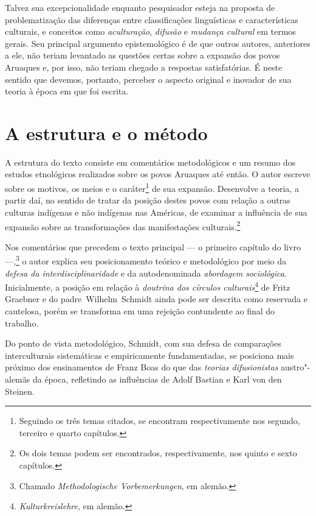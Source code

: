 Talvez sua excepcionalidade enquanto pesquisador esteja na proposta de problematização das diferenças entre classificações linguísticas e características culturais, e conceitos como \textit{aculturação}, \textit{difusão} e \textit{mudança cultural} em termos gerais. Seu principal argumento epistemológico é de que outros autores, anteriores a ele, não teriam levantado as questões certas sobre a expansão dos povos Aruaques e, por isso, não teriam chegado a respostas satisfatórias. É neste sentido que devemos, portanto, perceber o aspecto original e inovador de sua teoria à época em que foi escrita.

\section{A estrutura e o método}

A estrutura do texto consiste em comentários metodológicos e um resumo dos estudos etnológicos realizados sobre os povos Aruaques até então. O autor escreve sobre os motivos, os meios e o caráter\footnote{Seguindo os três temas citados, se encontram respectivamente nos segundo, terceiro e quarto capítulos.} de sua expansão. Desenvolve a teoria, a partir daí, no sentido de tratar da posição destes povos com relação a outras culturas indígenas e não indígenas nas Américas, de examinar a influência de sua expansão sobre as transformações das manifestações culturais.\footnote{Os dois temas podem ser encontrados, respectivamente, nos quinto e sexto capítulos.} 

Nos comentários que precedem o texto principal --- o primeiro capítulo do livro ---,\footnote{Chamado \textit{Methodologische Vorbemerkungen}, em alemão.} o autor explica seu posicionamento teórico e metodológico por meio da \emph{defesa da interdisciplinaridade} e da autodenominada \emph{abordagem sociológica}. Inicialmente, a posição em relação à \textit{doutrina dos círculos culturais}\footnote{\textit{Kulturkreislehre}, em alemão.} de Fritz Graebner e do padre~Wilhelm~Schmidt ainda pode ser descrita como reservada e cautelosa, porém se transforma em uma rejeição contundente ao final do trabalho. 

Do ponto de vista metodológico, Schmidt, com sua defesa de comparações interculturais sistemáticas e empiricamente fundamentadas, se posiciona mais próximo dos ensinamentos de Franz Boas do que das \textit{teorias difusionistas} austro"-alemãs da época, refletindo as influências de Adolf Bastian e Karl von den Steinen.

